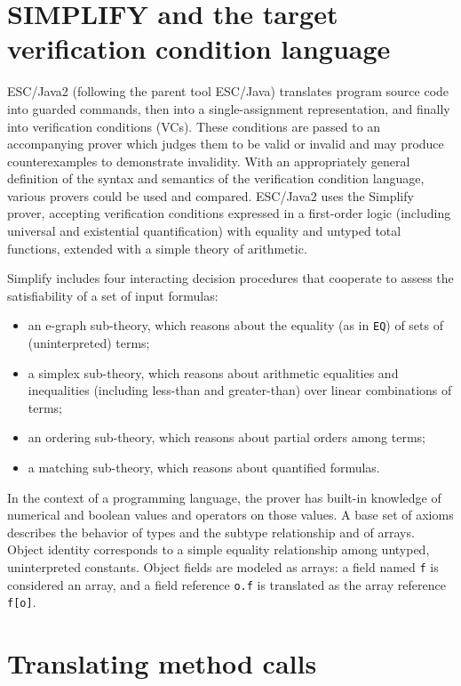 \documentclass{sig-alternate}
\begin{document}
\section{SIMPLIFY and the target verification condition language}

ESC/Java2 (following the parent tool ESC/Java) translates program source code into guarded commands, then into a single-assignment representation, and 
finally
into verification conditions (VCs).  These conditions are passed to an accompanying prover which
judges them to be valid or invalid and may produce counterexamples to demonstrate
invalidity.  With an appropriately general definition of the syntax and semantics of the verification
condition language, various provers could be used and compared.  ESC/Java2 uses the
Simplify \cite{nelson80,simplify} prover, accepting verification conditions expressed in a
first-order logic (including universal and existential quantification) with equality and untyped total
functions, extended with a simple theory of arithmetic.


Simplify includes four interacting decision procedures
 that cooperate to assess the satisfiability of a 
set of input formulas:
\begin{itemize}
\item an e-graph sub-theory, which reasons about the equality (as in \texttt{EQ}) of sets of
(uninterpreted) terms;
\item a simplex sub-theory, which reasons about arithmetic equalities and inequalities (including less-than and greater-than) over linear combinations
of terms;
\item an ordering sub-theory, which reasons about partial orders among terms;
\item a matching sub-theory, which reasons about quantified formulas.
\end{itemize}

In the context of a programming language, the prover has built-in knowledge of numerical and
boolean values and operators on those values.  A base set of axioms describes the behavior 
of types and the subtype relationship and of arrays.  Object identity corresponds to a simple
equality relationship among untyped, uninterpreted constants.  Object fields are modeled as
arrays: a field named \texttt{f} is considered an array, and a field reference \texttt{o.f} is
translated as the array reference \texttt{f[o]}.

\section{Translating method calls}
\end{document}
